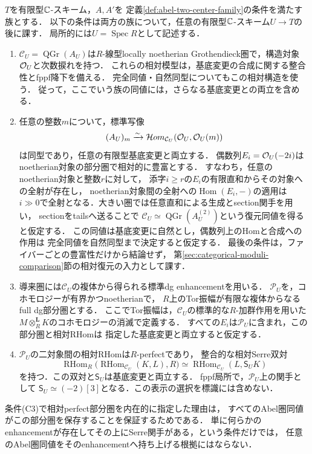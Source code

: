 $T$を有限型$\mathbb C$-スキーム，$A,A'$を
定義\ref{def:abel-two-center-family}の条件を満たす族とする．
以下の条件は両方の族について，任意の有限型$\mathbb C$-スキーム$U\to T$の後に課す．
局所的には$U=\operatorname{Spec}R$として記述する．
\begin{enumerate}[label=\textup{(C\arabic*)}]
\item $\mathcal C_U=\operatorname{QGr}(A_U)$は$R$-線型locally noetherian
Grothendieck圏で，構造対象$\mathcal O_U$と次数捩れを持つ．
これらの相対模型は，基底変更の合成に関する整合性とfppf降下を備える．
完全同値・自然同型についてもこの相対構造を使う．
従って，ここでいう族の同値には，さらなる基底変更との両立を含める．
\item 任意の整数$m$について，標準写像
\[
 (A_U)_m\xrightarrow{\sim}
 \mathcal Hom_{\mathcal C_U}(\mathcal O_U,\mathcal O_U(m))
\]
は同型であり，任意の有限型基底変更と両立する．
偶数列$E_i=\mathcal O_U(-2i)$はnoetherian対象の部分圏で相対的に豊富とする．
すなわち，任意のnoetherian対象と整数$r$に対して，
添字$i\geq r$の$E_i$の有限直和からその対象への全射が存在し，
noetherian対象間の全射への$\operatorname{Hom}(E_i,-)$の適用は
$i\gg0$で全射となる．大きい圏では任意直和による生成とsection関手を用い，
sectionをtailsへ送ることで
$\mathcal C_U\simeq\operatorname{QGr}(A_U^{(2)})$という復元同値を得ると仮定する．
この同値は基底変更に自然とし，偶数列上のHomと合成への作用は
完全同値を自然同型まで決定すると仮定する．
最後の条件は，ファイバーごとの豊富性だけから結論せず，
第\ref{sec:categorical-moduli-comparison}節の相対復元の入力として課す．
\item 導来圏には$\mathcal C_U$の複体から得られる標準dg enhancementを用いる．
$\mathcal P_U$を，コホモロジーが有界かつnoetherianで，
$R$上のTor振幅が有限な複体からなるfull dg部分圏とする．
ここでTor振幅は，$\mathcal C_U$の標準的な$R$-加群作用を用いた
$M\otimes_R^{\mathbf L}K$のコホモロジーの消滅で定義する．
すべての$E_i$は$\mathcal P_U$に含まれ，この部分圏と相対RHomは
指定した基底変更と両立すると仮定する．
\item $\mathcal P_U$の二対象間の相対RHomは$R$-perfectであり，
整合的な相対Serre双対
\[
 \operatorname{RHom}_R
 \bigl(\operatorname{RHom}_{\mathcal C_U}(K,L),R\bigr)
 \simeq
 \operatorname{RHom}_{\mathcal C_U}(L,\mathsf S_U K)
\]
を持つ．この双対と$\mathsf S_U$は基底変更と両立する．
fppf局所で，$\mathcal P_U$上の関手として
$\mathsf S_U\simeq(-2)[3]$となる．この表示の選択を標識には含めない．
\end{enumerate}

条件\textup{(C3)}で相対perfect部分圏を内在的に指定した理由は，
すべてのAbel圏同値がこの部分圏を保存することを保証するためである．
単に何らかのenhancementが存在してその上にSerre関手がある，という条件だけでは，
任意のAbel圏同値をそのenhancementへ持ち上げる根拠にはならない．

